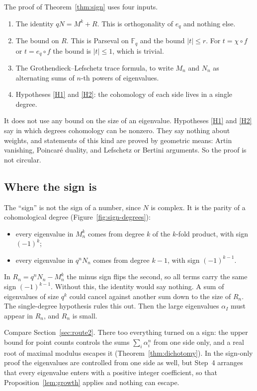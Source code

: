 \documentclass[11pt]{amsbook}
\theoremstyle{plain}
\theoremstyle{definition}
\theoremstyle{remark}
\numberwithin{equation}{section}
\numberwithin{figure}{chapter}
\numberwithin{table}{chapter}
\newcommand{\F}{\mathbb{F}}
\begin{document}
The proof of Theorem~\ref{thm:sign} uses four inputs.
\begin{enumerate}[label=(\arabic*)]
\item The identity $qN = M^k + R$. This is orthogonality of $e_q$
  and nothing else.
\item The bound on $R$. This is Parseval on $\F_q$ and the bound
  $|t| \le r$. For $t = \chi\circ f$ or $t = e_q\circ f$ the bound
  is $|t| \le 1$, which is trivial.
\item The Grothendieck--Lefschetz trace formula, to write $M_n$ and
  $N_n$ as alternating sums of $n$-th powers of eigenvalues.
\item Hypotheses \ref{H1} and \ref{H2}: the cohomology of each side
  lives in a single degree.
\end{enumerate}
It does not use any bound on the size of an eigenvalue. Hypotheses
\ref{H1} and \ref{H2} say in which degrees cohomology can be
nonzero. They say nothing about weights, and statements of this
kind are proved by geometric means: Artin vanishing, Poincar\'e
duality, and Lefschetz or Bertini arguments. So the proof is not
circular.

\subsection{Where the sign is}

The ``sign'' is not the sign of a number, since $N$ is complex. It
is the parity of a cohomological degree (Figure~\ref{fig:sign-degrees}):
\begin{itemize}
\item every eigenvalue in $M_n^k$ comes from degree $k$ of the
  $k$-fold product, with sign $(-1)^k$;
\item every eigenvalue in $q^nN_n$ comes from degree $k-1$, with
  sign $(-1)^{k-1}$.
\end{itemize}
In $R_n = q^nN_n - M_n^k$ the minus sign flips the second, so all
terms carry the same sign $(-1)^{k-1}$. Without this, the identity
would say nothing. A sum of eigenvalues of size $q^{k}$ could
cancel against another sum down to the size of $R_n$. The
single-degree hypothesis rules this out. Then the large
eigenvalues $\alpha_I$ must appear in $R_n$, and $R_n$ is small.
\begin{figure}[tbp]
\centering

\end{figure}

Compare Section~\ref{sec:route2}. There too everything turned on a
sign: the upper bound for point
counts controls the sums $\sum_i\alpha_i^n$ from one side only, and
a real root of maximal modulus escapes it
(Theorem~\ref{thm:dichotomy}). In the sign-only proof the
eigenvalues are controlled from one side as well, but
Step~4 arranges that every eigenvalue enters with a positive
integer coefficient, so that Proposition~\ref{lem:growth} applies
and nothing can escape.
\end{document}
